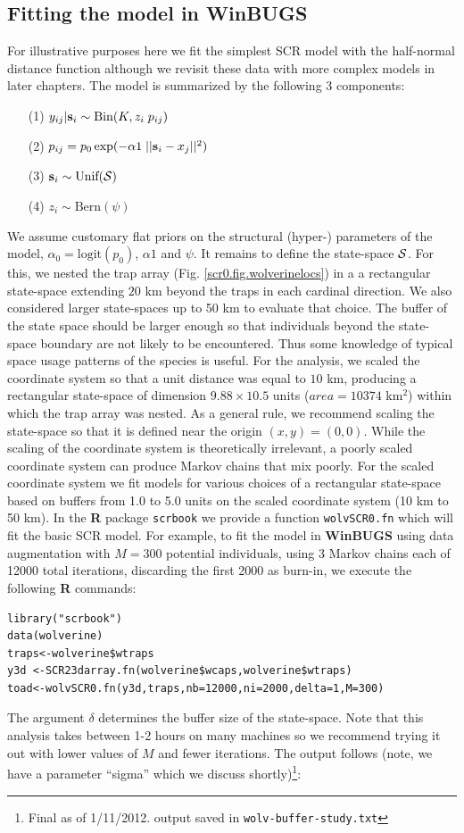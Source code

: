 \subsection{Fitting the model in WinBUGS}

For illustrative purposes here we fit the simplest SCR model with the
half-normal distance function although we revisit these data with more
complex models in later chapters. The model is summarized by the
following 3 components:
\begin{itemize}
\item[(1)] $y_{ij}|{\bf s}_{i} \sim \mbox{Bin}(K, z_{i}\; p_{ij})$
\item[(2)] $p_{ij} = p_{0} \exp(-\alpha1 \; ||{\bf s}_{i}-x_{j}||^2)$
\item[(3)] $ {\bf s}_{i} \sim \mbox{Unif}({\cal S})$
\item[(4)] $ z_{i} \sim \mbox{Bern}(\psi)$
\end{itemize}
We assume customary flat priors on the structural (hyper-) parameters
of the model, $\alpha_{0} = \mbox{logit}(p_{0})$, $\alpha1$ and $\psi$.  It remains to define the
state-space ${\cal S}$. For this, we nested the trap array (Fig.
\ref{scr0.fig.wolverinelocs}) in a
a rectangular state-space extending $20$ km beyond the traps in each cardinal
direction.  We also considered larger state-spaces up to 50 km to
evaluate that choice.  The buffer of the state space should be larger
enough so that individuals beyond the state-space boundary are not
likely to be encountered. Thus some knowledge of typical space usage
patterns of the species is useful.  For the analysis, 
we scaled the coordinate system 
so that a unit distance was equal to $10$ km, producing a rectangular
state-space of dimension $9.88 \times 10.5$ units ($area = 10374$ km$^2$)
within which the trap array was nested. As a general rule, we
recommend scaling the state-space so that it is defined near the
origin $(x,y)=(0,0)$. While the scaling of the coordinate system is
theoretically irrelevant, a poorly scaled coordinate system can
produce Markov chains that mix poorly.  For the scaled coordinate
system we fit models for various choices of a rectangular state-space
based on 
buffers from 1.0 to 5.0 units on the scaled coordinate system (10 km to
50 km). In the {\bf R} package \mbox{\tt scrbook} we provide a
function
\mbox{\tt wolvSCR0.fn} which will fit the basic SCR model. For
example, to fit the model in 
{\bf WinBUGS} using data augmentation with $M=300$ potential individuals,
using 3 Markov chains each of 12000 total iterations, discarding the
first 2000 as burn-in, we execute the following {\bf R} commands:
{\small
\begin{verbatim}
library("scrbook")
data(wolverine)
traps<-wolverine$wtraps
y3d <-SCR23darray.fn(wolverine$wcaps,wolverine$wtraps)
toad<-wolvSCR0.fn(y3d,traps,nb=12000,ni=2000,delta=1,M=300)
\end{verbatim}
}
The argument $\delta$ determines the buffer size of the state-space.
Note that this analysis takes 
between 1-2 hours on many machines so we recommend trying it out with
lower values of $M$ and fewer iterations.
The output
follows (note, we have a parameter ``sigma'' which we discuss
shortly)\footnote{Final as of 1/11/2012. 
output saved in \mbox{\tt wolv-buffer-study.txt}}:

